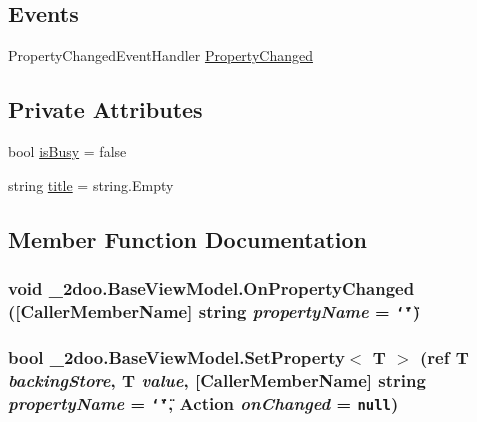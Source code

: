 \subsection*{Events}
\begin{CompactItemize}
\item 
PropertyChangedEventHandler \hyperlink{class__2doo_1_1_base_view_model_df404d5944001b6d91d88dd4cac4e682}{PropertyChanged}
\end{CompactItemize}
\subsection*{Private Attributes}
\begin{CompactItemize}
\item 
bool \hyperlink{class__2doo_1_1_base_view_model_2a7c2caffdf4c32c0c29841b5165d900}{isBusy} = false
\item 
string \hyperlink{class__2doo_1_1_base_view_model_c0cfcfe34cfd7f175d26314e08c8052d}{title} = string.Empty
\end{CompactItemize}


\subsection{Member Function Documentation}
\hypertarget{class__2doo_1_1_base_view_model_cd7a51efc7fd0b8ef1649165eda3d96f}{
\subsubsection[{OnPropertyChanged}]{\setlength{\rightskip}{0pt plus 5cm}void \_\-2doo.BaseViewModel.OnPropertyChanged (\mbox{[}CallerMemberName\mbox{]} string {\em propertyName} = {\tt \char`\"{}\char`\"{}})}}
\label{class__2doo_1_1_base_view_model_cd7a51efc7fd0b8ef1649165eda3d96f}


\hypertarget{class__2doo_1_1_base_view_model_7e567a53e0ba559b55afdb3f7abcc5b3}{
\subsubsection[{SetProperty$<$ T $>$}]{\setlength{\rightskip}{0pt plus 5cm}bool \_\-2doo.BaseViewModel.SetProperty$<$ T $>$ (ref T {\em backingStore}, \/  T {\em value}, \/  \mbox{[}CallerMemberName\mbox{]} string {\em propertyName} = {\tt \char`\"{}\char`\"{}}, \/  Action {\em onChanged} = {\tt null})}}
\label{class__2doo_1_1_base_view_model_7e567a53e0ba559b55afdb3f7abcc5b3}




